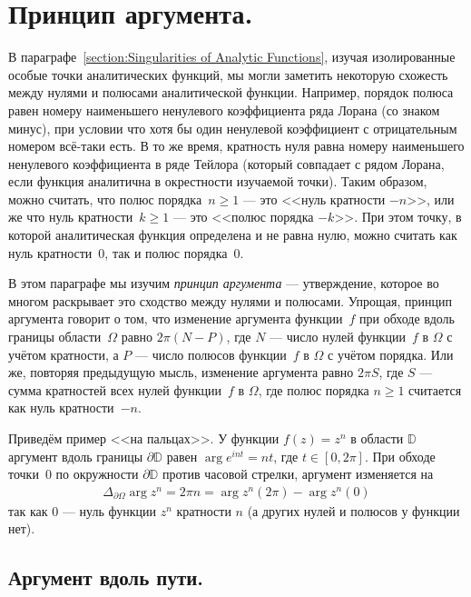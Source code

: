 \documentclass[../complex-analysis.tex]{subfiles}
\begin{document}
\newpage
\section{Принцип аргумента.}

В параграфе~\ref{section:Singularities of Analytic Functions}, изучая изолированные особые точки аналитических функций, мы могли заметить некоторую схожесть между нулями и полюсами аналитической функции. Например, порядок полюса равен номеру наименьшего ненулевого коэффициента ряда Лорана (со знаком минус), при условии что хотя бы один ненулевой коэффициент с отрицательным номером всё-таки есть. В то же время, кратность нуля равна номеру наименьшего ненулевого коэффициента в ряде Тейлора (который совпадает с рядом Лорана, если функция аналитична в окрестности изучаемой точки). Таким образом, можно считать, что полюс порядка~$ n \geqslant 1 $ --- это <<нуль кратности $ -n $>>, или же что нуль кратности~$ k \geqslant 1 $ --- это <<полюс порядка $ -k $>>. При этом точку, в которой аналитическая функция определена и не равна нулю, можно считать как нуль кратности~$ 0 $, так и полюс порядка~$ 0 $.

В этом параграфе мы изучим \emph{принцип аргумента} --- утверждение, которое во многом раскрывает это сходство между нулями и полюсами. Упрощая, принцип аргумента говорит о том, что изменение аргумента функции~$ f $ при обходе вдоль границы области~$ \Omega $ равно $ 2\pi(N - P) $, где $ N $ --- число нулей функции~$ f $ в $ \Omega $ с учётом кратности, а $ P $ --- число полюсов функции~$ f $ в $ \Omega $ с учётом порядка. Или же, повторяя предыдущую мысль, изменение аргумента равно $ 2\pi S $, где $ S $ --- сумма кратностей всех нулей функции~$ f $ в $ \Omega $, где полюс порядка $ n \geqslant 1 $ считается как нуль кратности~$ -n $.

Приведём пример <<на пальцах>>. У функции $ f(z) = z^{n} $ в области $ \mathbb D $ аргумент вдоль границы $ \partial\mathbb D $ равен $ \arg e^{int} = nt $, где $ t \in [0,2\pi] $. При обходе точки~$ 0 $ по окружности $ \partial\mathbb D $ против часовой стрелки, аргумент изменяется на
\begin{align*}
 \Delta_{\partial\Omega} \arg z^{n} = 2\pi n = \arg z^{n}(2\pi) - \arg z^{n}(0)
\end{align*} так как $ 0 $ --- нуль функции $ z^{n} $ кратности $ n $ (а других нулей и полюсов у функции нет).

\subsection{Аргумент вдоль пути.}
\end{document}
